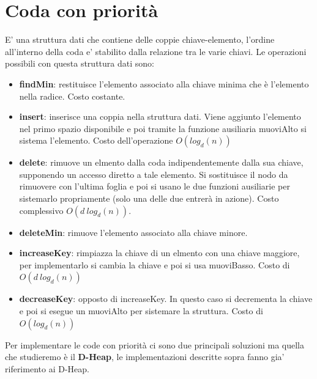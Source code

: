 \documentclass{article}
\begin{document}
\section{Coda con priorità}
E' una struttura dati che contiene delle coppie chiave-elemento, l'ordine all'interno della coda e' stabilito dalla relazione tra le varie chiavi.
Le operazioni possibili con questa struttura dati sono:
\begin{itemize}
    \item \textbf{findMin}: restituisce l'elemento associato alla chiave minima che è l'elemento nella radice. Costo costante.
    \item \textbf{insert}: inserisce una coppia nella struttura dati. Viene aggiunto l'elemento nel primo spazio disponibile e poi tramite la funzione ausiliaria muoviAlto si sistema l'elemento. Costo dell'operazione $O(log_d(n))$
    \item \textbf{delete}: rimuove un elmento dalla coda indipendentemente dalla sua chiave, supponendo un accesso diretto a tale elemento. Si sostituisce il nodo da rimuovere con l'ultima foglia e poi si usano le due funzioni ausiliarie per sistemarlo propriamente (solo una delle due entrerà in azione). Costo complessivo $O(d\ log_d(n))$.
    \item \textbf{deleteMin}: rimuove l'elemento associato alla chiave minore.
    \item \textbf{increaseKey}: rimpiazza la chiave di un elmento con una chiave maggiore, per implementarlo si cambia la chiave e poi si usa muoviBasso. Costo di $O(d \ log_d(n))$
    \item \textbf{decreaseKey}: opposto di increaseKey. In questo caso si decrementa la chiave e poi si esegue un muoviAlto per sistemare la struttura. Costo di $O(log_d(n))$
\end{itemize}

Per implementare le code con priorità ci sono due principali soluzioni ma quella che studieremo è il \textbf{D-Heap}, le implementazioni descritte sopra fanno gia' riferimento ai D-Heap.
\end{document}
